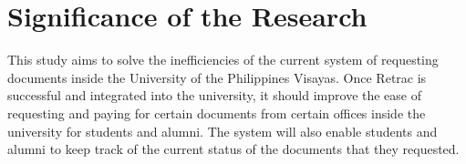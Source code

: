 \section{Significance of the Research}
\label{sec:significance}

This study aims to solve the inefficiencies of the current system of requesting documents inside the University of the Philippines Visayas. Once Retrac is successful and integrated into the university, it should improve the ease of requesting and paying for certain documents from certain offices inside the university for students and alumni. The system will also enable students and alumni to keep track of the current status of the documents that they requested. 

